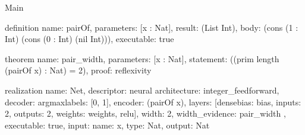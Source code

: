 \begin{lexlean}{Main}
\begin{semanticmodule}
definition{
  name: pairOf,
  parameters: [x : Nat],
  result: (List Int),
  body: (cons (1 : Int) (cons (0 : Int) (nil Int))),
  executable: true
}

theorem{
  name: pair_width,
  parameters: [x : Nat],
  statement: ((prim length (pairOf x) : Nat) = 2),
  proof: reflexivity{}
}

realization{
  name: Net,
  descriptor: neural{
    architecture: integer_feedforward,
    decoder: argmax{labels: [0, 1]},
    encoder: (pairOf x),
    layers: [dense{bias: bias, inputs: 2, outputs: 2, weights: weights}, relu{}],
    width: 2,
    width_evidence: pair_width
  },
  executable: true,
  input: {name: x, type: Nat},
  output: Nat
}
\end{semanticmodule}
\end{lexlean}
